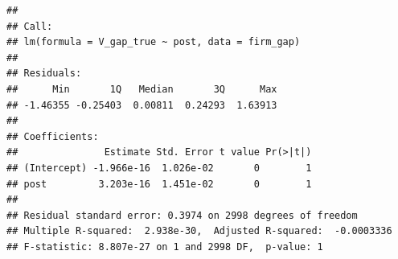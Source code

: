 \documentclass[
]{article}
\newenvironment{Shaded}{\begin{snugshade}}{\end{snugshade}}
\newcommand{\AttributeTok}[1]{\textcolor[rgb]{0.13,0.29,0.53}{#1}}
\newcommand{\ConstantTok}[1]{\textcolor[rgb]{0.56,0.35,0.01}{#1}}
\newcommand{\ControlFlowTok}[1]{\textcolor[rgb]{0.13,0.29,0.53}{\textbf{#1}}}
\newcommand{\FunctionTok}[1]{\textcolor[rgb]{0.13,0.29,0.53}{\textbf{#1}}}
\newcommand{\NormalTok}[1]{#1}
\newcommand{\OtherTok}[1]{\textcolor[rgb]{0.56,0.35,0.01}{#1}}
\newcommand{\SpecialCharTok}[1]{\textcolor[rgb]{0.81,0.36,0.00}{\textbf{#1}}}
\newcommand{\StringTok}[1]{\textcolor[rgb]{0.31,0.60,0.02}{#1}}
\begin{document}
\begin{verbatim}
## 
## Call:
## lm(formula = V_gap_true ~ post, data = firm_gap)
## 
## Residuals:
##      Min       1Q   Median       3Q      Max 
## -1.46355 -0.25403  0.00811  0.24293  1.63913 
## 
## Coefficients:
##               Estimate Std. Error t value Pr(>|t|)
## (Intercept) -1.966e-16  1.026e-02       0        1
## post         3.203e-16  1.451e-02       0        1
## 
## Residual standard error: 0.3974 on 2998 degrees of freedom
## Multiple R-squared:  2.938e-30,  Adjusted R-squared:  -0.0003336 
## F-statistic: 8.807e-27 on 1 and 2998 DF,  p-value: 1
\end{verbatim}

\begin{Shaded}
\end{Shaded}
\end{document}
